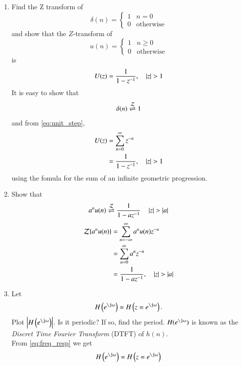 \documentclass[journal,12pt,twocolumn]{IEEEtran}
\renewcommand\thesection{\arabic{section}}
\begin{document}
\begin{enumerate}[label=\thesection.\arabic*]
%
\item Find the Z transform of 
\begin{equation}
	\delta(n)
	=
	\begin{cases}
		1 & n = 0
		\\
		0 & \text{otherwise}
	\end{cases}
\end{equation}
and show that the $Z$-transform of
\begin{equation}
	\label{eq:unit_step}
	u(n)
	=
	\begin{cases}
		1 & n \ge 0
		\\
		0 & \text{otherwise}
	\end{cases}
\end{equation}
is
\begin{equation}
	U(z) = \frac{1}{1-z^{-1}}, \quad \left\vert z\right\vert > 1
\end{equation}
\solution It is easy to show that
\begin{equation}
	\delta(n) \overset{\mathcal{Z}}{ \rightleftharpoons} 1
\end{equation}
and from \eqref{eq:unit_step},
\begin{align}
	U(z) &= \sum _{n= 0}^{\infty}z^{-n}
	\\
	&=\frac{1}{1-z^{-1}}, \quad \left\vert z\right\vert > 1
\end{align}
using the fomula for the sum of an infinite geometric progression.
%
\item Show that 
\begin{equation}
	\label{eq:anun}
	a^nu(n) \overset{\mathcal{Z}}{ \rightleftharpoons} \frac{1}{1-az^{-1}} \quad \left\vert z\right\vert > \left\vert a\right\vert
\end{equation}
\solution
\begin{align}
	{\mathcal {Z}}\{a^nu(n)\} &= \sum _{n=-\infty }^{\infty }a^nu(n)z^{-n}
	\\&=\sum _{n=0 }^{\infty }a^nz^{-n}
	\\&=\frac{1}{1-az^{-1}}, \quad \left\vert z\right\vert > \left\vert a\right\vert
\end{align}
%
\item 
Let
\begin{equation}
	H\brak{e^{\j \omega}} = H\brak{z = e^{\j \omega}}.
\end{equation}
Plot $\abs{H\brak{e^{\j \omega}}}$.  Is it periodic? If so, find the period. $H(e^{\j \omega})$ is
known as the {\em Discret Time Fourier Transform} (DTFT) of $h(n)$.
\\
\solution 
From \eqref{eq:freq_resp} we get
\begin{align}
	H\brak{e^{\j \omega}} &= H\brak{z = e^{\j \omega}}\\

\end{align}
\end{enumerate}
\end{document}
